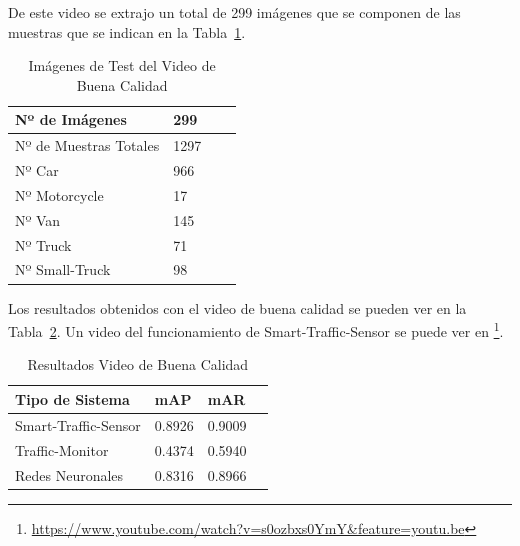 De este video se extrajo un total de 299 imágenes que se componen de las muestras que se indican en la Tabla~\ref{tabla_video_bueno}.

\begin{table}[htbp][H] 
\begin{center}
\begin{tabular}{|l|l|l|l|}
\hline
Nº de Imágenes  & 299 \\
\hline \hline
Nº de Muestras Totales & 1297\\ \hline
Nº Car & 966 \\ \hline
Nº Motorcycle & 17 \\ \hline
Nº Van & 145 \\ \hline
Nº Truck & 71 \\ \hline
Nº Small-Truck & 98 \\ \hline
\end{tabular}
\caption{Imágenes de Test del Video de Buena Calidad}
\label{tabla_video_bueno}
\end{center}
\end{table}

Los resultados obtenidos con el video de buena calidad se pueden ver en la Tabla~\ref{resultados_video_bueno}. Un video del funcionamiento de Smart-Traffic-Sensor se puede ver en \footnote{\url{https://www.youtube.com/watch?v=s0ozbxs0YmY&feature=youtu.be}}.

\begin{table}[htbp][H] 
\begin{center}
\begin{tabular}{|l|l|l|l|}
\hline
Tipo de Sistema & mAP & mAR  \\ 
\hline \hline
Smart-Traffic-Sensor & 0.8926 & 0.9009 \\ \hline
Traffic-Monitor & 0.4374 & 0.5940 \\ \hline
Redes Neuronales & 0.8316 & 0.8966\\ \hline
\end{tabular}
\caption{Resultados Video de Buena Calidad}
\label{resultados_video_bueno}
\end{center}
\end{table}

